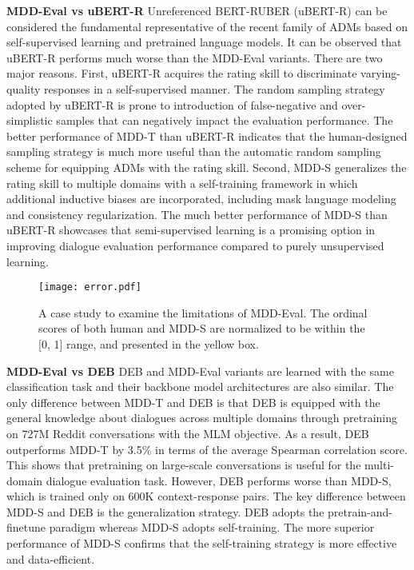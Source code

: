 \documentclass[letterpaper]{article} \usepackage{aaai22}  \usepackage{times}  \usepackage{helvet}  \usepackage{courier}  \usepackage[hyphens]{url}  \usepackage{graphicx} \urlstyle{rm} \def\UrlFont{\rm}  \usepackage{natbib}  \usepackage{caption} \DeclareCaptionStyle{ruled}{labelfont=normalfont,labelsep=colon,strut=off} \frenchspacing  \setlength{\pdfpagewidth}{8.5in}  \setlength{\pdfpageheight}{11in}  \usepackage{algorithm}
\begin{document}
\bigskip
\noindent\textbf{MDD-Eval vs uBERT-R} 
Unreferenced BERT-RUBER (uBERT-R) can be considered the fundamental representative of the recent family of ADMs based on self-supervised learning and pretrained language models. It can be observed that uBERT-R performs much worse than the MDD-Eval variants. There are two major reasons. First, uBERT-R acquires the rating skill to discriminate varying-quality responses in a self-supervised manner. The random sampling strategy adopted by uBERT-R is prone to introduction of false-negative and over-simplistic samples that can negatively impact the evaluation performance. The better performance of MDD-T than uBERT-R indicates that the human-designed sampling strategy is much more useful than the automatic random sampling scheme for equipping ADMs with the rating skill. Second, MDD-S generalizes the rating skill to multiple domains with a self-training framework in which additional inductive biases are incorporated, including mask language modeling and consistency regularization. The much better performance of MDD-S than uBERT-R showcases that semi-supervised learning is a promising option in improving dialogue evaluation performance compared to purely unsupervised learning.

\begin{figure*}[h!]
\centering
\texttt{[image: error.pdf]} \caption{A case study to examine the limitations of MDD-Eval. The ordinal scores of both human and MDD-S are normalized to be within the [0, 1] range, and presented in the yellow box.}  
\label{error-example}
\end{figure*}

\bigskip
\noindent\textbf{MDD-Eval vs DEB} DEB and MDD-Eval variants are learned with the same classification task and their backbone model architectures are also similar. The only difference between MDD-T and DEB is that DEB is equipped with the general knowledge about dialogues across multiple domains through pretraining on 727M Reddit conversations with the MLM objective. As a result, DEB outperforms MDD-T by 3.5\% in terms of the average Spearman correlation score. This shows that pretraining on large-scale conversations is useful for the multi-domain dialogue evaluation task. However, DEB performs worse than MDD-S, which is trained only on 600K context-response pairs. The key difference between MDD-S and DEB is the generalization strategy. DEB adopts the pretrain-and-finetune paradigm whereas MDD-S adopts self-training. The more superior performance of MDD-S confirms that the self-training strategy is more effective and data-efficient.
\end{document}
